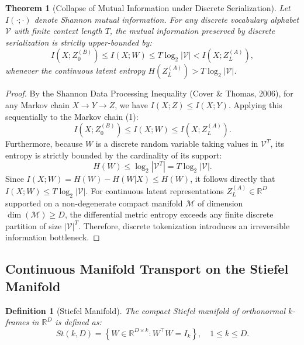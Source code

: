 \documentclass[journal,twocolumn]{IEEEtran}
\newtheorem{theorem}{Theorem}
\newtheorem{definition}{Definition}
\begin{document}
\begin{theorem}[Collapse of Mutual Information under Discrete Serialization]
\label{thm:dpi}
Let $I(\cdot ; \cdot)$ denote Shannon mutual information. For any discrete vocabulary alphabet $\mathcal{V}$ with finite context length $T$, the mutual information preserved by discrete serialization is strictly upper-bounded by:
\begin{equation}
I(X; Z_0^{(B)}) \le I(X; W) \le T \log_2 |\mathcal{V}| < I(X; Z_L^{(A)}),
\end{equation}
whenever the continuous latent entropy $H(Z_L^{(A)}) > T \log_2 |\mathcal{V}|$.
\end{theorem}

\begin{proof}
By the Shannon Data Processing Inequality (Cover \& Thomas, 2006), for any Markov chain $X \to Y \to Z$, we have $I(X; Z) \le I(X; Y)$. Applying this sequentially to the Markov chain (1):
\begin{equation}
I(X; Z_0^{(B)}) \le I(X; W) \le I(X; Z_L^{(A)}).
\end{equation}
Furthermore, because $W$ is a discrete random variable taking values in $\mathcal{V}^T$, its entropy is strictly bounded by the cardinality of its support:
\begin{equation}
H(W) \le \log_2 |\mathcal{V}^T| = T \log_2 |\mathcal{V}|.
\end{equation}
Since $I(X; W) = H(W) - H(W|X) \le H(W)$, it follows directly that $I(X; W) \le T \log_2 |\mathcal{V}|$. For continuous latent representations $Z_L^{(A)} \in \mathbb{R}^D$ supported on a non-degenerate compact manifold $\mathcal{M}$ of dimension $\dim(\mathcal{M}) \ge D$, the differential metric entropy exceeds any finite discrete partition of size $|\mathcal{V}|^T$. Therefore, discrete tokenization introduces an irreversible information bottleneck.
\end{proof}

\subsection{Continuous Manifold Transport on the Stiefel Manifold}

\begin{definition}[Stiefel Manifold]
The compact Stiefel manifold of orthonormal $k$-frames in $\mathbb{R}^D$ is defined as:
\begin{equation}
St(k, D) = \left\{ W \in \mathbb{R}^{D \times k} : W^\top W = I_k \right\}, \quad 1 \le k \le D.
\end{equation}
\end{definition}
\end{document}

